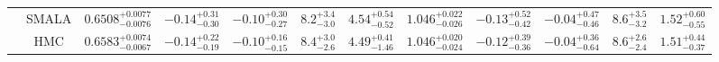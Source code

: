 \documentclass{aa}
\begin{document}
\begin{appendix}
\begin{sidewaystable*}
\begin{tabular}{c c c c c c c c c c c c}
   \rule{0pt}{4ex} & SMALA & $0.6508^{+0.0077}_{-0.0076}$ & $-0.14^{+0.31}_{-0.30}$ & $-0.10^{+0.30}_{-0.27}$ & $8.2^{+3.4}_{-3.0}$ & $4.54^{+0.54}_{-0.52}$ & $1.046^{+0.022}_{-0.026}$ & $-0.13^{+0.52}_{-0.42}$ & $-0.04^{+0.47}_{-0.46}$ & $8.6^{+3.5}_{-3.2}$ & $1.52^{+0.60}_{-0.55}$\\
   \rule{0pt}{4ex} & HMC & $0.6583^{+0.0074}_{-0.0067}$ & $-0.14^{+0.22}_{-0.19}$ & $-0.10^{+0.16}_{-0.15}$ & $8.4^{+3.0}_{-2.6}$ & $4.49^{+0.41}_{-1.46}$ & $1.046^{+0.020}_{-0.024}$ & $-0.12^{+0.39}_{-0.36}$ & $-0.04^{+0.36}_{-0.64}$ & $8.6^{+2.6}_{-2.4}$ & $1.51^{+0.44}_{-0.37}$\\
\hline  
\end{tabular}
\end{sidewaystable*}

\end{appendix}

\end{document}
